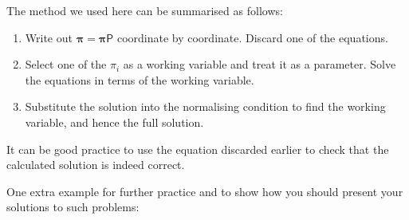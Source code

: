 \documentclass[
  a4paper,
]{article}
\providecommand{\tightlist}{%
  \setlength{\itemsep}{0pt}\setlength{\parskip}{0pt}}
\theoremstyle{definition}
\theoremstyle{definition}
\theoremstyle{definition}
\theoremstyle{remark}
\begin{document}
The method we used here can be summarised as follows:

\begin{enumerate}
\def\labelenumi{\arabic{enumi}.}
\tightlist
\item
  Write out \(\boldsymbol \pi = \boldsymbol \pi\mathsf P\) coordinate by coordinate. Discard one of the equations.
\item
  Select one of the \(\pi_i\) as a working variable and treat it as a parameter. Solve the equations in terms of the working variable.
\item
  Substitute the solution into the normalising condition to find the working variable, and hence the full solution.
\end{enumerate}

It can be good practice to use the equation discarded earlier to check that the calculated solution is indeed correct.

One extra example for further practice and to show how you should present your solutions to such problems:
\end{document}
